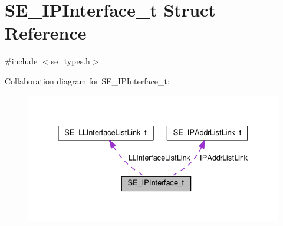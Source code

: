 \hypertarget{structSE__IPInterface__t}{}\section{S\+E\+\_\+\+I\+P\+Interface\+\_\+t Struct Reference}
\label{structSE__IPInterface__t}


{\ttfamily \#include $<$se\+\_\+types.\+h$>$}



Collaboration diagram for S\+E\+\_\+\+I\+P\+Interface\+\_\+t\+:\nopagebreak
\begin{figure}[H]
\begin{center}
\leavevmode
\includegraphics[width=332pt]{structSE__IPInterface__t__coll__graph}
\end{center}
\end{figure}
